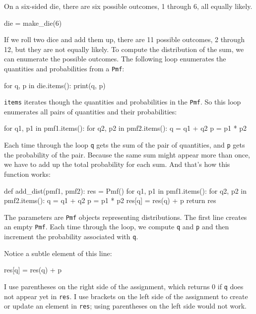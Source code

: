 \documentclass[12pt]{book}
\theoremstyle{exercise}
\newcommand{\py}[1]{{\tt #1}}%
\begin{document}
On a six-sided die, there are six possible outcomes, 1 through 6, all equally likely.

\begin{code}
die = make_die(6)
\end{code}

If we roll two dice and add them up, there are 11 possible outcomes, 2 through 12, but they are not equally likely.
To compute the distribution of the sum, we can enumerate the possible outcomes.
The following loop enumerates the quantities and probabilities from a \py{Pmf}:

\begin{code}
for q, p in die.items():
    print(q, p)
\end{code}

\py{items} iterates though the quantities and probabilities in the \py{Pmf}.
So this loop enumerates all pairs of quantities and their probabilities:

\begin{code}
for q1, p1 in pmf1.items():
    for q2, p2 in pmf2.items():
        q = q1 + q2
        p = p1 * p2
\end{code}

Each time through the loop \py{q} gets the sum of the pair of quantities, and \py{p} gets the probability of the pair.
Because the same sum might appear more than once, we have to add up the total probability for each sum.
And that's how this function works:

\begin{code}
def add_dist(pmf1, pmf2):
    res = Pmf()
    for q1, p1 in pmf1.items():
        for q2, p2 in pmf2.items():
            q = q1 + q2
            p = p1 * p2
            res[q] = res(q) + p
    return res
\end{code}

The parameters are \py{Pmf} objects representing distributions.
The first line creates an empty \py{Pmf}.
Each time through the loop, we compute \py{q} and \py{p} and then increment the probability associated with \py{q}.

Notice a subtle element of this line:

\begin{code}
            res[q] = res(q) + p
\end{code}

I use parentheses on the right side of the assignment, which returns 0 if \py{q} does not appear yet in \py{res}.
I use brackets on the left side of the assignment to create or update an element in \py{res}; using parentheses on the left side would not work.
\end{document}
